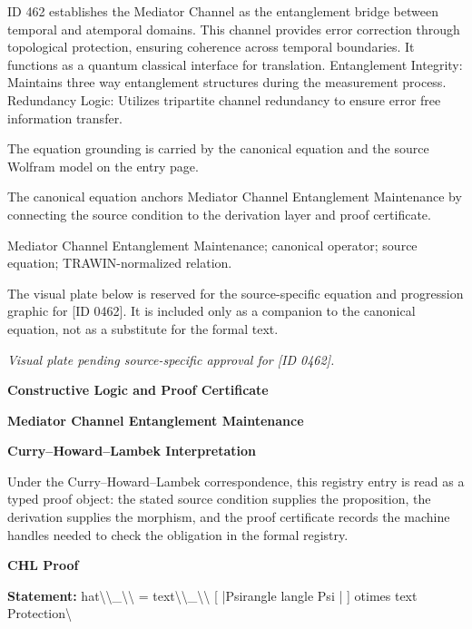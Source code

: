 ID 462 establishes the Mediator Channel as the entanglement bridge between temporal and atemporal domains. This channel provides error correction through topological protection, ensuring coherence across temporal boundaries. It functions as a quantum classical interface for translation. Entanglement Integrity: Maintains three way entanglement structures during the measurement process. Redundancy Logic: Utilizes tripartite channel redundancy to ensure error free information transfer.

The equation grounding is carried by the canonical equation and the source Wolfram model on the entry page.

The canonical equation anchors Mediator Channel Entanglement Maintenance by connecting the source condition to the derivation layer and proof certificate.

Mediator Channel Entanglement Maintenance; canonical operator; source equation; TRAWIN-normalized relation.
\endgroup

\begingroup\footnotesize\sloppy
The visual plate below is reserved for the source-specific equation and progression graphic for [ID 0462]. It is included only as a companion to the canonical equation, not as a substitute for the formal text.
\par\endgroup
\begingroup\footnotesize\itshape
Visual plate pending source-specific approval for [ID 0462].
\par\endgroup

\clearpage
\begingroup\tzpsupportsetup
\noindent\textbf{\fontsize{10.8pt}{12.8pt}\selectfont [ID 0462] Constructive Logic and Proof Certificate}\par
\noindent\textbf{\fontsize{10pt}{12pt}\selectfont Mediator Channel Entanglement Maintenance}\par
\vspace{0.45em}
\begingroup
\footnotesize
\setlength{\parskip}{0.22em}
\setlength{\parindent}{0pt}
\noindent\textbf{Curry--Howard--Lambek Interpretation}\par
Under the Curry--Howard--Lambek correspondence, this registry entry is read as a typed proof
object: the stated source condition supplies the proposition, the derivation supplies the
morphism, and the proof certificate records the machine handles needed to check the obligation
in the formal registry.

\vspace{0.45em}
\noindent\textbf{CHL Proof}\par
\textbf{Statement:} hat\textbackslash{}\textbackslash{}\_\textbackslash{}\textbackslash{} = text\textbackslash{}\textbackslash{}\_\textbackslash{}\textbackslash{} [ |Psirangle langle Psi | ] otimes text Protection\textbackslash{}

